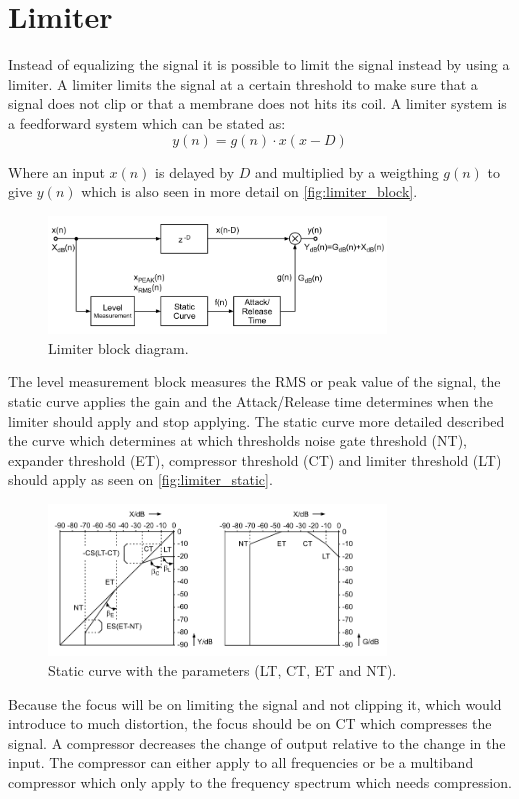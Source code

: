 \section{Limiter}
Instead of equalizing the signal it is possible to limit the signal instead by using a limiter. A limiter limits the signal at a certain threshold to make sure that a signal does not clip or that a membrane does not hits its coil. A limiter system is a feedforward system which can be stated as:
\begin{equation}
y(n) = g(n)\cdot x(x-D)
\end{equation}

Where an input $x(n)$ is delayed by $D$ and multiplied by a weigthing $g(n)$ to give $y(n)$ which is also seen in more detail on \autoref{fig:limiter_block}.   

\begin{figure}[H]
\centering
\includegraphics[width=0.8\textwidth]{figures/Limiter_block.png}
\caption{Limiter block diagram.}
\label{fig:limiter_block}
\end{figure}   


The level measurement block measures the RMS or peak value of the signal, the static curve applies the gain and the Attack/Release time determines when the limiter should apply and stop applying. The static curve more detailed described the curve which determines at which thresholds noise gate threshold (NT), expander threshold (ET), compressor threshold (CT) and limiter threshold (LT) should apply as seen on \autoref{fig:limiter_static}.

\begin{figure}[H]
\centering
\includegraphics[width=0.8\textwidth]{figures/limiter_static_curve.png}
\caption{Static curve with the parameters (LT, CT, ET and NT).}
\label{fig:limiter_static}
\end{figure}  

Because the focus will be on limiting the signal and not clipping it, which would introduce to much distortion, the focus should be on CT which compresses the signal. A compressor decreases the change of output relative to the change in the input. The compressor can either apply to all frequencies or be a multiband compressor which only apply to the frequency spectrum which needs compression. 

      